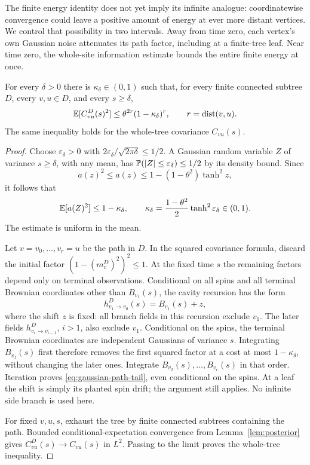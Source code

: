 The finite energy identity does not yet imply its infinite analogue:
coordinatewise convergence could leave a positive amount of energy at
ever more distant vertices.  We control that possibility in two
intervals.  Away from time zero, each vertex's own Gaussian noise
attenuates its path factor, including at a finite-tree leaf.  Near time
zero, the whole-site information estimate bounds the entire finite
energy at once.

\begin{lemma}
 \label{lem:gaussian-path-tail}
For every $\delta>0$ there is $\kappa_\delta\in(0,1)$ such that, for
every finite connected subtree $D$, every $v,u\in D$, and every
$s\ge\delta$,
\begin{equation}
 \label{eq:gaussian-path-tail}
 \E[C_{vu}^D(s)^2]
     \le\theta^{2r}(1-\kappa_\delta)^r,
       \qquad r=\dist(v,u).
\end{equation}
The same inequality holds for the whole-tree covariance $C_{vu}(s)$.
\end{lemma}

\begin{proof}
Choose $\varepsilon_\delta>0$ with
$2\varepsilon_\delta/\sqrt{2\pi\delta}\le1/2$.  A Gaussian random
variable $Z$ of variance $s\ge\delta$, with any mean, has
$\P(|Z|\le\varepsilon_\delta)\le1/2$ by its density bound.  Since
\[
 a(z)^2\le a(z)
      \le 1-(1-\theta^2)\tanh^2z,
\]
it follows that
\[
 \E[a(Z)^2]\le1-\kappa_\delta,\qquad
 \kappa_\delta=\frac{1-\theta^2}{2}
                         \tanh^2\varepsilon_\delta\in(0,1).
\]
The estimate is uniform in the mean.

Let $v=v_0,\ldots,v_r=u$ be the path in $D$.  In the squared covariance
formula, discard the initial factor
$(1-(m_v^D)^2)^2\le1$.  At the fixed time $s$ the remaining factors
depend only on terminal observations.  Conditional on all spins and
all terminal Brownian coordinates other than $B_{v_1}(s)$, the cavity
recursion has the form
\[
 h_{v_1\to v_0}^D(s)=B_{v_1}(s)+z,
\]
where the shift $z$ is fixed: all branch fields in this recursion
exclude $v_1$.  The later fields
$h_{v_i\to v_{i-1}}^D$, $i>1$, also exclude $v_1$.  Conditional on the
spins, the terminal Brownian coordinates are independent Gaussians of
variance $s$.  Integrating $B_{v_1}(s)$ first therefore removes the
first squared factor at a cost at most $1-\kappa_\delta$, without
changing the later ones.  Integrate $B_{v_2}(s),\ldots,B_{v_r}(s)$ in
that order.  Iteration proves \eqref{eq:gaussian-path-tail}, even
conditional on the spins.  At a leaf the shift is simply its planted
spin drift; the argument still applies.  No infinite side branch is
used here.

For fixed $v,u,s$, exhaust the tree by finite connected subtrees
containing the path.  Bounded conditional-expectation convergence
from Lemma~\ref{lem:posterior} gives $C_{vu}^D(s)\to C_{vu}(s)$ in
$L^2$.  Passing to the limit proves the whole-tree inequality.
\end{proof}


